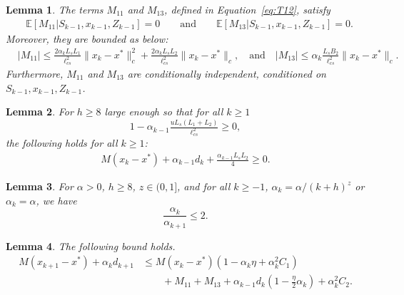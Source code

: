\documentclass[10pt,a4paper]{amsart}
\newtheorem{lemma}{Lemma}
\newcommand{\E}[1]{\mathbb{E}\lrs{#1}}
\newcommand{\lcs}{\ell_{cs}}
\newcommand{\lrp}[1]{\left( #1 \right)}
\newcommand{\lrs}[1]{\left[ #1 \right]}
\newcommand{\xk}{x_k}
\begin{document}
\begin{lemma}\label{lem:T11Properties}
    The terms $M_{11}$ and $M_{13}$, defined in Equation~\eqref{eq:T12}, satisfy 
    \begin{align*} 
    &\E{ M_{11} | S_{k-1}, x_{k-1}, Z_{k-1} }  = 0 \qquad \text{and} \qquad \E{M_{13} | S_{k-1}, x_{k-1}, Z_{k-1}} = 0.
    \end{align*}
    Moreover, they are bounded as below:
    \begin{align*} 
        &|M_{11}| \le \frac{2\alpha_k L_s L_1}{\lcs^2}\|\xk- x^*\|^2_c + \frac{2\alpha_k L_s L_2}{\lcs^2}\|\xk-x^*\|_c, \quad \text{and} \quad  |M_{13}| \le \alpha_k \frac{L_s B_2}{\lcs^2} \|x_k -x^*\|_c.
    \end{align*}
    Furthermore, $M_{11}$ and $M_{13}$ are conditionally independent, conditioned on $S_{k-1}, x_{k-1}, Z_{k-1}$. 
\end{lemma}

\begin{lemma}\label{lem:nonnegLyapunov} For $h \ge 8$ large enough so that for all $k\ge 1$
\[ 1 - \alpha_{k-1}\tfrac{uL_s(L_1+L_2)}{\lcs^2} \ge 0, \]
the following holds for all $k\ge 1$: 
    \begin{align*}
        M(x_k - x^*) + \alpha_{k-1} d_k + \tfrac{\alpha_{k-1}L_sL_2}{4} \ge 0.
    \end{align*}
\end{lemma}

\begin{lemma}\label{lem:ratioofalpha}
    For $\alpha > 0$, $h \ge 8$, $z\in (0,1]$, and for all $k\ge -1$,  $\alpha_k = \alpha/(k+h)^z$ or $\alpha_k = \alpha$, we have
    \[ \frac{\alpha_k}{\alpha_{k+1}}\le 2. \]
\end{lemma}

\begin{lemma}\label{lem:rec1beforeexp} The following bound holds.
    \begin{align*}
        M(x_{k+1} - x^*) + \alpha_k d_{k+1} &\le M(\xk - x^*) \lrp{1-\alpha_k \eta + \alpha^2_k C_1 } \\
        &\qquad+ M_{11} + M_{13} + \alpha_{k-1}d_k \lrp{1-\tfrac{\eta}{2}\alpha_k} + \alpha^2_k C_2.
    \end{align*}
\end{lemma}
\end{document}

